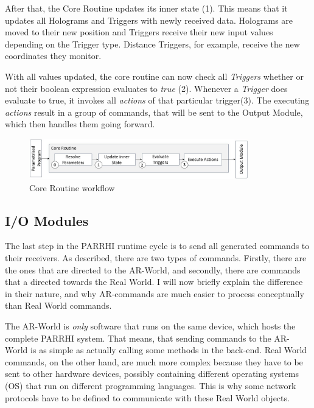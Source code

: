 After that, the Core Routine updates its inner state (1). This means that it updates all Holograms and Triggers with newly received data. Holograms are moved to their new position and Triggers receive their new input values depending on the Trigger type. Distance Triggers, for example, receive the new coordinates they monitor.

With all values updated, the core routine can now check all \textit{Triggers} whether or not their boolean expression evaluates to \textit{true} (2). Whenever a \textit{Trigger} does evaluate to true, it invokes all \textit{actions} of that particular trigger(3). The executing \textit{actions} result in a group of commands, that will be sent to the Output Module, which then handles them going forward. 

\begin{figure}[!h]
	\centering
	\includegraphics[width=0.85\textwidth]{Figures/CoreRoutine.jpg}
	\caption{Core Routine workflow}
	\label{Fig:CoreRoutine}
\end{figure}

\subsection{I/O Modules}

The last step in the PARRHI runtime cycle is to send all generated commands to their receivers. As described, there are two types of commands. Firstly, there are the ones that are directed to the AR-World, and secondly, there are commands that a directed towards the Real World. I will now briefly explain the difference in their nature, and why AR-commands are much easier to process conceptually than Real World commands.

The AR-World is \textit{only} software that runs on the same device, which hosts the complete PARRHI system. That means, that sending commands to the AR-World is as simple as actually calling some methods in the back-end. Real World commands, on the other hand, are much more complex because they have to be sent to other hardware devices, possibly containing different operating systems (OS) that run on different programming languages. This is why some network protocols have to be defined to communicate with these Real World objects. 

